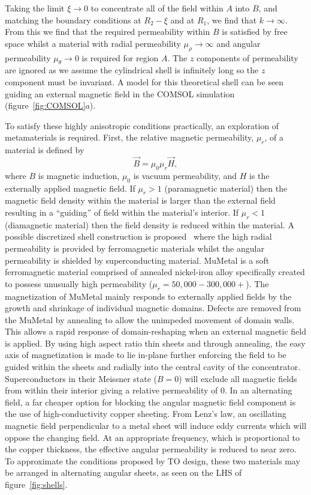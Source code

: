 \documentclass[11pt]{iopart}
\begin{document}
Taking the limit $\xi \rightarrow 0$ to concentrate all of
the field within $A$ into $B$, and matching the boundary conditions at
$R_2-\xi$ and at $R_1$, we find that $k \rightarrow \infty$. From this
we find that the required permeability within $B$ is satisfied by free
space whilst a material with radial permeability $\mu_\rho \rightarrow
\infty$ and angular permeability $\mu_\theta \rightarrow 0$ is
required for region $A$. The $z$ components of permeability are ignored
as we assume the cylindrical shell is
infinitely long so the $z$ component must be invariant. A model for
this theoretical shell can be seen guiding an external magnetic field
in the COMSOL simulation (figure~\ref{fig:COMSOL}$a$).

To satisfy these highly anisotropic conditions practically, an
exploration of metamaterials is required. First, the relative magnetic
permeability, $\mu_r$, of a material is defined by
\vspace{-0.2em}
\begin{equation}
  \vec{B} = \mu_0\mu_r \vec{H},
\end{equation}
\vspace{-0.2em}
where $B$ is magnetic induction, $\mu_0$ is vacuum permeability, and
$H$ is the externally applied magnetic field. If $\mu_r>1$
(paramagnetic material) then the magnetic field density within the
material is larger than the external field resulting in a ``guiding''
of field within the material's interior. If $\mu_r<1$ (diamagnetic
material) then the field density is reduced within the material.  A
possible discretized shell construction is proposed~\cite{N2014} where
the high radial permeability is provided by ferromagnetic materials
whilst the angular permeability is shielded by superconducting
material.  MuMetal is a soft ferromagnetic material comprised of
annealed nickel-iron alloy specifically created to possess unusually
high permeability ($\mu_r = 50,000-300,000+$).  The magnetization of
MuMetal mainly responds to externally applied fields by the growth and
shrinkage of individual magnetic domains. Defects are removed from the
MuMetal by annealing to allow the unimpeded movement of domain
walls. This allows a rapid response of domain-reshaping when an
external magnetic field is applied.  By using high aspect ratio thin
sheets and through annealing, the easy axis of magnetization is made
to lie in-plane further enforcing the field to be guided within the
sheets and radially into the central cavity of the
concentrator. Superconductors in their Meissner state ($B = 0$) will
exclude all magnetic fields from within their interior giving a
relative permeability of $0$. In an alternating field, a far cheaper
option for blocking the angular magnetic field component is the use of
high-conductivity copper sheeting. From Lenz's law, an oscillating
magnetic field perpendicular to a metal sheet will induce eddy
currents which will oppose the changing field. At an appropriate
frequency, which is proportional to the copper thickness, the
effective angular permeability is reduced to near zero. To approximate
the conditions proposed by TO design, these two materials may be
arranged in alternating angular sheets, as seen on the LHS of
figure~\ref{fig:shells}.
\end{document}
